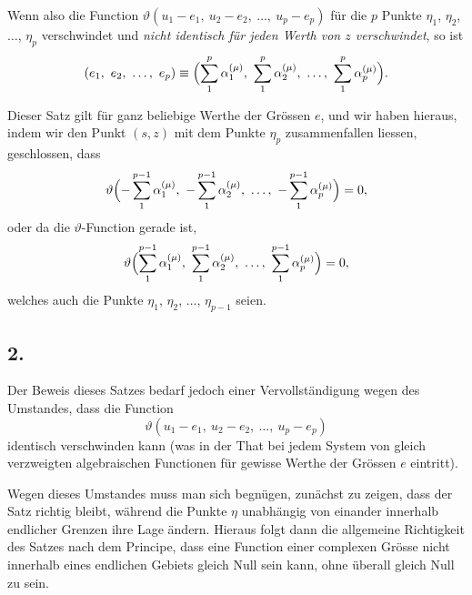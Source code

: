 \documentclass[12pt,a4paper]{article}
\begin{document}
Wenn also die Function $\vartheta(u_1-e_1,\ u_2-e_2,\ \ldots,\ u_p-e_p)$ für die $p$ Punkte $\eta_1$, $\eta_2$, $\ldots$, $\eta_p$ verschwindet und \textit{nicht identisch für jeden Werth von $z$ verschwindet}, so ist
\[ (e_1,\ e_2,\ \ldots,\ e_p) \equiv \Bigl(\sum_1^p \alpha_1^{(\mu)},\ \sum_1^p \alpha_2^{(\mu)},\ \ldots,\ \sum_1^p \alpha_p^{(\mu)}\Bigr). \]

Dieser Satz gilt für ganz beliebige Werthe der Grössen $e$, und wir haben hieraus, indem wir den Punkt $(s, z)$ mit dem Punkte $\eta_p$ zusammenfallen liessen, geschlossen, dass
\[ \vartheta\Bigl(-\sum_1^{p-1} \alpha_1^{(\mu)},\ -\sum_1^{p-1} \alpha_2^{(\mu)},\ \ldots,\ -\sum_1^{p-1} \alpha_p^{(\mu)}\Bigr) = 0, \]
oder da die $\vartheta$-Function gerade ist,
\[ \vartheta\Bigl(\sum_1^{p-1} \alpha_1^{(\mu)},\ \sum_1^{p-1} \alpha_2^{(\mu)},\ \ldots,\ \sum_1^{p-1} \alpha_p^{(\mu)}\Bigr) = 0, \]
welches auch die Punkte $\eta_1$, $\eta_2$, $\ldots$, $\eta_{p-1}$ seien.

\subsection*{2.}

Der Beweis dieses Satzes bedarf jedoch einer Vervollständigung wegen des Umstandes, dass die Function
\[ \vartheta(u_1-e_1,\ u_2-e_2,\ \ldots,\ u_p-e_p) \]
identisch verschwinden kann (was in der That bei jedem System von gleich verzweigten algebraischen Functionen für gewisse Werthe der Grössen $e$ eintritt).

Wegen dieses Umstandes muss man sich begnügen, zunächst zu zeigen, dass der Satz richtig bleibt, während die Punkte $\eta$ unabhängig von einander innerhalb endlicher Grenzen ihre Lage ändern. Hieraus folgt dann die allgemeine Richtigkeit des Satzes nach dem Principe, dass eine Function einer complexen Grösse nicht innerhalb eines endlichen Gebiets gleich Null sein kann, ohne überall gleich Null zu sein.
\end{document}
